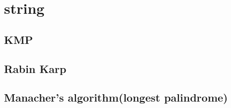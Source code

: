 \section{string}
\subsection{KMP}
\subsection{Rabin Karp}
\subsection{Manacher's algorithm(longest palindrome)}
